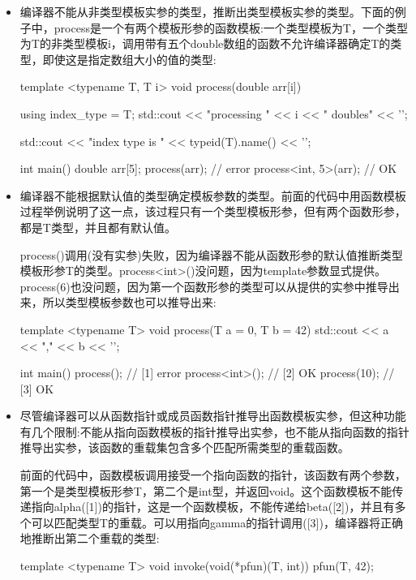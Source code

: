 \begin{itemize}
\item
编译器不能从非类型模板实参的类型，推断出类型模板实参的类型。下面的例子中，process是一个有两个模板形参的函数模板:一个类型模板为T，一个类型为T的非类型模板i，调用带有五个double数组的函数不允许编译器确定T的类型，即使这是指定数组大小的值的类型:

\begin{cpp}
template <typename T, T i>
void process(double arr[i])
{
	using index_type = T;
	std::cout << "processing " << i
	          << " doubles" << '\n';
	          
	std::cout << "index type is "
              << typeid(T).name() << '\n';
}

int main()
{
	double arr[5]{};
	process(arr); // error
	process<int, 5>(arr); // OK
}
\end{cpp}

\item
编译器不能根据默认值的类型确定模板参数的类型。前面的代码中用函数模板过程举例说明了这一点，该过程只有一个类型模板形参，但有两个函数形参，都是T类型，并且都有默认值。

process()调用(没有实参)失败，因为编译器不能从函数形参的默认值推断类型模板形参T的类型。process<int>()没问题，因为template参数显式提供。process(6)也没问题，因为第一个函数形参的类型可以从提供的实参中推导出来，所以类型模板参数也可以推导出来:

\begin{cpp}
template <typename T>
void process(T a = 0, T b = 42)
{
	std::cout << a << "," << b << '\n';
}

int main()
{
	process(); // [1] error
	process<int>(); // [2] OK
	process(10); // [3] OK
}
\end{cpp}

\item
尽管编译器可以从函数指针或成员函数指针推导出函数模板实参，但这种功能有几个限制:不能从指向函数模板的指针推导出实参，也不能从指向函数的指针推导出实参，该函数的重载集包含多个匹配所需类型的重载函数。

前面的代码中，函数模板调用接受一个指向函数的指针，该函数有两个参数，第一个是类型模板形参T，第二个是int型，并返回void。这个函数模板不能传递指向alpha([1])的指针，这是一个函数模板，不能传递给beta([2])，并且有多个可以匹配类型T的重载。可以用指向gamma的指针调用([3])，编译器将正确地推断出第二个重载的类型:

\begin{cpp}
template <typename T>
void invoke(void(*pfun)(T, int))
{
	pfun(T{}, 42);
}


\end{cpp}
\end{itemize}
